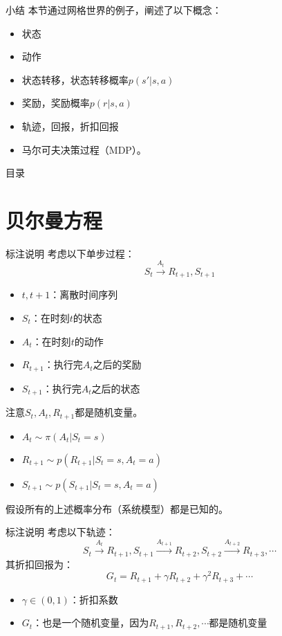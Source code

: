 \documentclass[aspectratio=169,xcolor=dvipsnames]{beamer}
\begin{document}
\begin{frame}{小结}
    本节通过网格世界的例子，阐述了以下概念：
    \begin{itemize}
        \item 状态
        \item 动作
        \item 状态转移，状态转移概率$p(s'|s, a)$
        \item 奖励，奖励概率$p(r|s,a)$
        \item 轨迹，回报，折扣回报
        \item 马尔可夫决策过程（MDP）。
    \end{itemize}
\end{frame}

\begin{frame}{目录}
    \tableofcontents
\end{frame}

\section{贝尔曼方程}

\begin{frame}{标注说明}
    考虑以下单步过程：
    \[
        S_t\xrightarrow{A_t}R_{t+1},S_{t+1}
    \]
    \begin{itemize}
        \item $t,t+1$：离散时间序列
        \item $S_t$：在时刻$t$的状态
        \item $A_t$：在时刻$t$的动作
        \item $R_{t+1}$：执行完$A_t$之后的奖励
        \item $S_{t+1}$：执行完$A_t$之后的状态
    \end{itemize}
    注意$S_t,A_t,R_{t+1}$都是随机变量。

    \begin{itemize}
        \item $A_t\sim \pi(A_t|S_t=s)$
        \item $R_{t+1}\sim p(R_{t+1}|S_t=s,A_t=a)$
        \item $S_{t+1}\sim p(S_{t+1}|S_t=s,A_t=a)$
    \end{itemize}
    假设所有的上述概率分布（系统模型）都是已知的。
\end{frame}

\begin{frame}{标注说明}
    考虑以下轨迹：
    \[
        S_t\xrightarrow{A_t}R_{t+1},S_{t+1}\xrightarrow{A_{t+1}}R_{t+2},S_{t+2}\xrightarrow{A_{t+2}}R_{t+3},\cdots
    \]
    其折扣回报为：
    \[
        G_t=R_{t+1}+\gamma R_{t+2}+\gamma^2 R_{t+3}+\cdots
    \]
    \begin{itemize}
        \item $\gamma\in(0,1)$：折扣系数
        \item $G_t$：也是一个随机变量，因为$R_{t+1},R_{t+2},\cdots$都是随机变量
    \end{itemize}
\end{frame}
\end{document}
